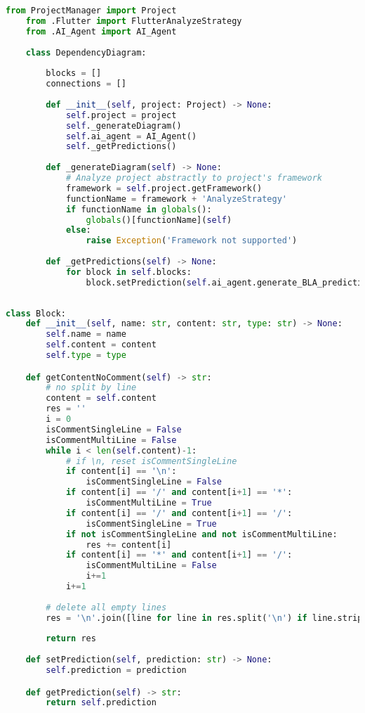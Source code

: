 \begin{lstlisting}[language=Python, caption={$\texttt{DependencyDiagram}$ class.}, label={lst:3}]
    from ProjectManager import Project
    from .Flutter import FlutterAnalyzeStrategy
    from .AI_Agent import AI_Agent
    
    class DependencyDiagram:
        
        blocks = []
        connections = []
        
        def __init__(self, project: Project) -> None:
            self.project = project
            self._generateDiagram()
            self.ai_agent = AI_Agent()
            self._getPredictions()
        
        def _generateDiagram(self) -> None:
            # Analyze project abstractly to project's framework
            framework = self.project.getFramework()
            functionName = framework + 'AnalyzeStrategy'
            if functionName in globals():
                globals()[functionName](self)
            else:
                raise Exception('Framework not supported')
            
        def _getPredictions(self) -> None:
            for block in self.blocks:
                block.setPrediction(self.ai_agent.generate_BLA_prediction(source_code=block.getContentNoComment(), chat_history=[]))
            
\end{lstlisting}

\begin{lstlisting}[language=Python, caption={$\texttt{Block}$ class.}, label={lst:4}]
    class Block:
    def __init__(self, name: str, content: str, type: str) -> None:
        self.name = name
        self.content = content
        self.type = type

    def getContentNoComment(self) -> str:
        # no split by line
        content = self.content
        res = ''
        i = 0
        isCommentSingleLine = False
        isCommentMultiLine = False
        while i < len(self.content)-1:
            # if \n, reset isCommentSingleLine
            if content[i] == '\n':
                isCommentSingleLine = False
            if content[i] == '/' and content[i+1] == '*':
                isCommentMultiLine = True
            if content[i] == '/' and content[i+1] == '/':
                isCommentSingleLine = True
            if not isCommentSingleLine and not isCommentMultiLine:
                res += content[i]
            if content[i] == '*' and content[i+1] == '/':
                isCommentMultiLine = False
                i+=1
            i+=1
        
        # delete all empty lines
        res = '\n'.join([line for line in res.split('\n') if line.strip() != ''])
        
        return res
    
    def setPrediction(self, prediction: str) -> None:
        self.prediction = prediction

    def getPrediction(self) -> str:
        return self.prediction
\end{lstlisting}

